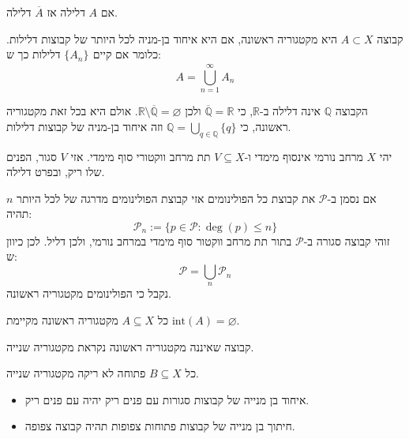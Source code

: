 \documentclass{tstextbook}
\begin{document}
\begin{corollary}
אם \(A\) דלילה אז \(\overline{A}\) דלילה.

\end{corollary}
\begin{definition}
קבוצה \(A\subset X\) היא מקטגוריה ראשונה, אם היא איחוד בן-מניה לכל היותר של קבוצות דלילות. כלומר אם קיים \(\{ A_{n} \}_{}\) דלילות כך ש:
$$A=\bigcup_{n=1}^{\infty}A_{n}$$

\end{definition}
\begin{example}[הרציונאלים]
הקבוצה \(\mathbb{Q}\) אינה דלילה ב-\(\mathbb{R}\), כי \(\overline{\mathbb{Q}}=\mathbb{R}\) ולכן \(\mathbb{R}\setminus\overline{\mathbb{Q}}=\varnothing\). אולם היא בכל זאת מקטגוריה ראשונה, כי \(\mathbb{Q}=\bigcup_{q\in\mathbb{Q}}\{q\}\) וזה איחוד בן-מניה של קבוצות דלילות.

\end{example}
\begin{lemma}
יהי \(X\) מרחב נורמי אינסוף מימדי ו-\(V\subseteq X\) תת מרחב ווקטורי סוף מימדי. אזי \(V\) סגור, הפנים שלו ריק, ובפרט דלילה.

\end{lemma}
\begin{example}[הפולינומים]
אם נסמן ב-\(\mathcal{P}\) את קבוצת כל הפולינומים אזי קבוצת הפולינומים מדרגה של לכל היותר \(n\) תהיה:
$${\mathcal{P}}_{n}:=\{p\in{\mathcal{P}}:\deg(p)\leq n\}$$
זוהי קבוצה סגורה ב-\(\mathcal{P}\) בתור תת מרחב ווקטור סוף מימדי במרחב נורמי, ולכן דליל. לכן כיוון ש:
$$\mathcal{P}=\bigcup_{n}\mathcal{P} _{n} $$
נקבל כי הפולינומים מקטגוריה ראשונה.

\end{example}
\begin{proposition}
כל \(A\subseteq X\) מקטגוריה ראשונה מקיימת \(\text{int}(A)=\varnothing\).

\end{proposition}
\begin{definition}
קבוצה שאיננה מקטגוריה ראשונה נקראת מקטגוריה שנייה.

\end{definition}
\begin{proposition}
כל \(B\subseteq X\) פתוחה לא ריקה מקטגוריה שנייה.

\end{proposition}
\begin{lemma}
  \begin{itemize}
    \item איחוד בן מנייה של קבוצות סגורות עם פנים ריק יהיה עם פנים ריק.
    \item חיתוך בן מנייה של קבוצות פתוחות צפופות תהיה קבוצה צפופה.
  \end{itemize}
\end{lemma}
\end{document}
